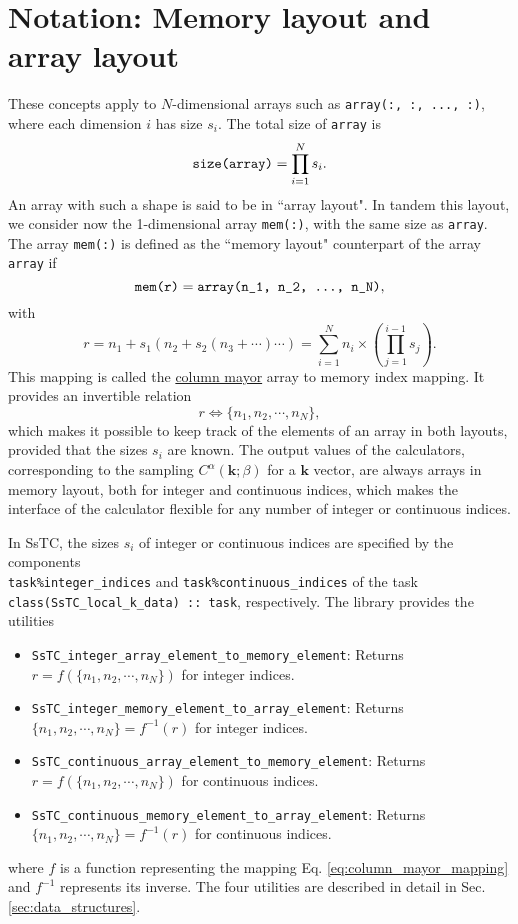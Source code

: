\documentclass[10pt,a4paper]{article}
\begin{document}
\section{Notation: Memory layout and array layout}\label{sec:notation}
These concepts apply to $N$-dimensional arrays such as \verb|array(:, :, ..., :)|, where each dimension $i$ has size $s_i$. The total size of \verb|array| is
\begin{equation}
\verb|size(array)| = \prod_{i=1}^N s_i.
\end{equation}
An array with such a shape is said to be in ``array layout". In tandem this layout, we consider now the 1-dimensional array \verb|mem(:)|, with the same size as \verb|array|. The array \verb|mem(:)| is defined as the ``memory layout" counterpart of the array \verb|array| if
\begin{equation}
\verb|mem(r)| = \verb|array(n_1, n_2, ..., n_N)|,
\end{equation}
with
\begin{equation}\label{eq:column_mayor_mapping}
r = n_1 + s_1\left(n_2 + s_2\left(n_3 + \cdots\right)\cdots\right) = \sum_{i=1}^N n_i\times \left(\prod_{j=1}^{i-1}s_j\right).
\end{equation}
This mapping is called the \href{https://eli.thegreenplace.net/2015/memory-layout-of-multi-dimensional-arrays}{column mayor} array to memory index mapping. It provides an invertible relation
\begin{equation}
r \Leftrightarrow \{n_1, n_2, \cdots, n_N\},
\end{equation}
which makes it possible to keep track of the elements of an array in both layouts, provided that the sizes $s_i$ are known. The output values of the calculators, corresponding to the sampling $C^{\alpha}(\bm{k};\beta)$ for a $\bm{k}$ vector, are always arrays in memory layout, both for integer and continuous indices, which makes the interface of the calculator flexible for any number of integer or continuous indices.

In SsTC, the sizes $s_i$ of integer or continuous indices are specified by the components \\ \verb|task%integer_indices| and \verb|task%continuous_indices| of the task \verb|class(SsTC_local_k_data) :: task|, respectively. The library provides the utilities
\begin{itemize}
\item \verb|SsTC_integer_array_element_to_memory_element|: Returns $r = f(\{n_1, n_2, \cdots, n_N\})$ for integer indices.
\item \verb|SsTC_integer_memory_element_to_array_element|: Returns $\{n_1, n_2, \cdots, n_N\} = f^{-1}(r)$ for integer indices.
\item \verb|SsTC_continuous_array_element_to_memory_element|: Returns $r = f(\{n_1, n_2, \cdots, n_N\})$ for continuous indices.
\item \verb|SsTC_continuous_memory_element_to_array_element|: Returns $\{n_1, n_2, \cdots, n_N\} = f^{-1}(r)$ for continuous indices.
\end{itemize}
where $f$ is a function representing the mapping Eq. \eqref{eq:column_mayor_mapping} and $f^{-1}$ represents its inverse. The four utilities are described in detail in Sec. \ref{sec:data_structures}.
\end{document}
